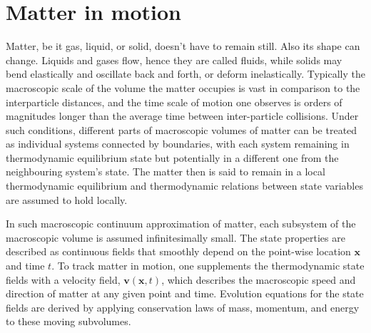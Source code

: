 \section{Matter in motion}
Matter, be it gas, liquid, or solid, doesn't have to remain still. Also its shape can change. Liquids and gases flow, hence they are called fluids, while solids may bend elastically and oscillate back and forth, or deform inelastically. Typically the macroscopic scale of the volume the matter occupies is vast in comparison to the interparticle distances, and the time scale of motion one observes is orders of magnitudes longer than the average time between inter-particle collisions. Under such conditions, different parts of macroscopic volumes of matter can be treated as individual systems connected by boundaries, with each system remaining in thermodynamic equilibrium state but potentially in a different one from the neighbouring system's state. The matter then is said to remain in a local thermodynamic equilibrium and thermodynamic relations between state variables are assumed to hold locally.

In such macroscopic continuum approximation of matter, each subsystem of the macroscopic volume is assumed infinitesimally small. The state properties are described as continuous fields that smoothly depend on the point-wise location $\bm{x}$ and time $t$. To track matter in motion, one supplements the thermodynamic state fields with a velocity field, $\bm{v}(\bm{x},t)$, which describes the macroscopic speed and direction of matter at any given point and time. Evolution equations for the state fields are derived by applying conservation laws of mass, momentum, and energy to these moving subvolumes.

